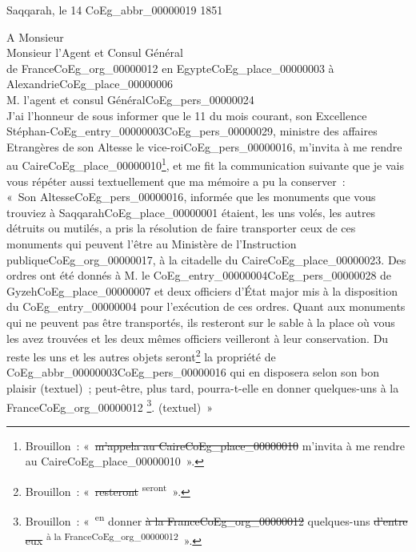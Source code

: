 \documentclass{book}
\begin{document}
\begin{flushright}Saqqarah, le 14 \gls{CoEg_abbr_00000019} 1851\end{flushright}
\indent A Monsieur\\
\indent \indent Monsieur l’Agent et Consul Général\\
\indent \indent de France\gls{CoEg_org_00000012} en Egypte\gls{CoEg_place_00000003} à Alexandrie\gls{CoEg_place_00000006}\\

\indent \hspace{1 cm} M. l’agent et consul Général\gls{CoEg_pers_00000024}\\
                  		
\indent J’ai l’honneur de sous informer que le 11 du mois courant, son Excellence Stéphan-\Gls{CoEg_entry_00000003}\gls{CoEg_pers_00000029}, ministre des affaires Etrangères de son Altesse le vice-roi\gls{CoEg_pers_00000016}, m’invita à me rendre au Caire\gls{CoEg_place_00000010}\footnote{Brouillon~: «~\sout{m’appela au Caire\gls{CoEg_place_00000010}} m’invita à me rendre au Caire\gls{CoEg_place_00000010}~».}, et me fit la communication suivante que je vais vous répéter aussi textuellement que ma mémoire a pu la conserver~:\\
\indent «~Son Altesse\gls{CoEg_pers_00000016}, informée que les monuments que vous trouviez à Saqqarah\gls{CoEg_place_00000001} étaient, les uns volés, les autres détruits ou mutilés, a pris la résolution de faire transporter ceux de ces monuments qui peuvent l’être au Ministère de l’Instruction publique\gls{CoEg_org_00000017}, à la citadelle du Caire\gls{CoEg_place_00000023}. Des ordres ont été donnés à M. le \Gls{CoEg_entry_00000004}\gls{CoEg_pers_00000028} de Gyzeh\gls{CoEg_place_00000007} et deux officiers d’État major mis à la disposition du \Gls{CoEg_entry_00000004} pour l’exécution de ces ordres. Quant aux monuments qui ne peuvent pas être transportés, ils resteront sur le sable à la place où vous les avez trouvées et les deux mêmes officiers veilleront à leur conservation. Du reste les uns et les autres objets seront\footnote{Brouillon~: «~\sout{resteront} \textsuperscript{seront}~».} la propriété de \gls{CoEg_abbr_00000003}\gls{CoEg_pers_00000016} qui en disposera selon son bon plaisir (textuel)~; peut-être, plus tard, pourra-t-elle en donner quelques-uns à la France\gls{CoEg_org_00000012} \footnote{Brouillon~: «~\textsuperscript{en} donner \sout{à la France\gls{CoEg_org_00000012}} quelques-uns \sout{d’entre eux} \textsuperscript{à la France\gls{CoEg_org_00000012}}~».}. (textuel)~»\\
\end{document}
